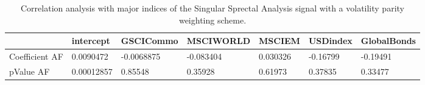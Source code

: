 \begin{table}[H]
\centering
\begin{tabular}{lllllll}
& intercept & GSCICommo & MSCIWORLD & MSCIEM & USDindex & GlobalBonds \\ 
\hline 
Coefficient AF & 0.0090472 & -0.0068875 & -0.083404 & 0.030326 & -0.16799 & -0.19491 \\ 
pValue AF & 0.00012857 & 0.85548 & 0.35928 & 0.61973 & 0.37835 & 0.33477 \\ 
\hline
\end{tabular}
\caption{Correlation analysis with major indices of the Singular Sprectal Analysis signal with a volatility parity weighting scheme.}
\label{SSA_IndQuantity_AFACTOR}
\end{table}